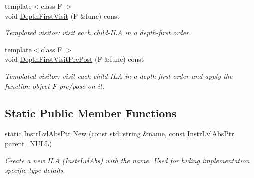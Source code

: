 \begin{DoxyCompactItemize}
\mbox{\label{classilang_1_1_instr_lvl_abs_a5970ae1457cb901be715769b67c6f555}} 
{\footnotesize template$<$class F $>$ }\\void \mbox{\hyperlink{classilang_1_1_instr_lvl_abs_a5970ae1457cb901be715769b67c6f555}{Depth\+First\+Visit}} (F \&func) const
\begin{DoxyCompactList}\small\item\em Templated visitor\+: visit each child-\/\+I\+LA in a depth-\/first order. \end{DoxyCompactList}\item 
\mbox{\label{classilang_1_1_instr_lvl_abs_abbacf1bc8c7c4380fb816c2a149212d8}} 
{\footnotesize template$<$class F $>$ }\\void \mbox{\hyperlink{classilang_1_1_instr_lvl_abs_abbacf1bc8c7c4380fb816c2a149212d8}{Depth\+First\+Visit\+Pre\+Post}} (F \&func) const
\begin{DoxyCompactList}\small\item\em Templated visitor\+: visit each child-\/\+I\+LA in a depth-\/first order and apply the function object F pre/pose on it. \end{DoxyCompactList}\end{DoxyCompactItemize}
\subsection*{Static Public Member Functions}
\begin{DoxyCompactItemize}
\item 
\mbox{\label{classilang_1_1_instr_lvl_abs_a70406b829225fc8d42f0bc32155f334e}} 
static \mbox{\hyperlink{classilang_1_1_instr_lvl_abs_a743fd98e5ad145d70cb0dabf8db0007c}{Instr\+Lvl\+Abs\+Ptr}} \mbox{\hyperlink{classilang_1_1_instr_lvl_abs_a70406b829225fc8d42f0bc32155f334e}{New}} (const std\+::string \&\mbox{\hyperlink{classilang_1_1_object_acf20b072e69f572910d7d80c93af0b38}{name}}, const \mbox{\hyperlink{classilang_1_1_instr_lvl_abs_a743fd98e5ad145d70cb0dabf8db0007c}{Instr\+Lvl\+Abs\+Ptr}} \mbox{\hyperlink{classilang_1_1_instr_lvl_abs_ab529f7a931940d7f870cc83fd214822f}{parent}}=N\+U\+LL)
\begin{DoxyCompactList}\small\item\em Create a new I\+LA (\mbox{\hyperlink{classilang_1_1_instr_lvl_abs}{Instr\+Lvl\+Abs}}) with the name. Used for hiding implementation specific type details. \end{DoxyCompactList}\end{DoxyCompactItemize}
